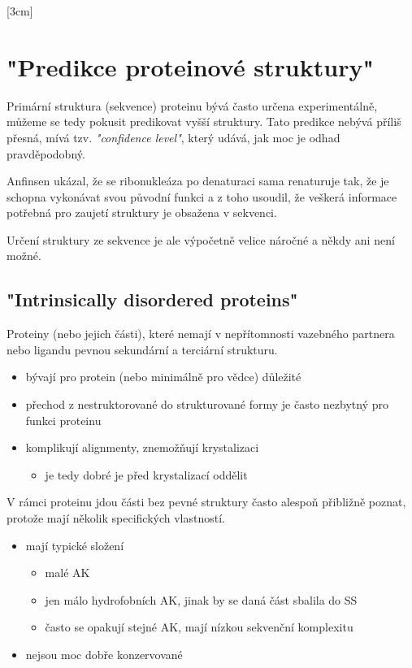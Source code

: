 \documentclass[DIV=8]{scrreprt}
\begin{document}
[3cm]

\section{"Predikce proteinové struktury"}

Primární struktura (sekvence) proteinu bývá často určena experimentálně, můžeme se tedy pokusit predikovat vyšší struktury. Tato predikce nebývá příliš přesná, mívá tzv. \emph{"confidence level"}, který udává, jak moc je odhad pravděpodobný.

Anfinsen ukázal, že se ribonukleáza po denaturaci sama renaturuje tak, že je schopna vykonávat svou původní funkci a z toho usoudil, že veškerá informace potřebná pro zaujetí struktury je obsažena v sekvenci.

Určení struktury ze sekvence je ale výpočetně velice náročné a někdy ani není možné.

\subsection{"Intrinsically disordered proteins"}

Proteiny (nebo jejich části), které nemají v nepřítomnosti vazebného partnera nebo ligandu pevnou sekundární a terciární strukturu.

\begin{itemize}
    \item bývají pro protein (nebo minimálně pro vědce) důležité
    \item přechod z nestruktorované do strukturované formy je často nezbytný pro funkci proteinu
    \item komplikují alignmenty, znemožňují krystalizaci
\begin{itemize}
    \item je tedy dobré je před krystalizací oddělit
\end{itemize}

\end{itemize}


V rámci proteinu jdou části bez pevné struktury často alespoň přibližně poznat, protože mají několik specifických vlastností.

\begin{itemize}
    \item mají typické složení
\begin{itemize}
    \item malé AK
    \item jen málo hydrofobních AK, jinak by se daná část sbalila do SS
    \item často se opakují stejné AK, mají nízkou sekvenční komplexitu
\end{itemize}

    \item nejsou moc dobře konzervované
\end{itemize}
\end{document}
